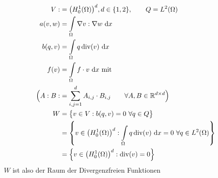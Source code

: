 \begin{beispiel}\label{beispiel8.1} %
	\begin{align*}
		V:&=\big(H_0^1(\Omega)\big)^d,d\in\lbrace1,2\rbrace,\qquad Q=L^2(\Omega)\\
		a(v,w)&=\int\limits_\Omega\nabla v:\nabla w\text{ d} x\\
		b(q,v)&=\int\limits_\Omega q\operatorname{div}(v)\text{ d} x\\
		f(v)&=\int\limits_\Omega f\cdot v\text{ d} x\text{ mit }\\
		\Big( A:B:&=\sum\limits_{i,j=1}^d A_{i,j}\cdot B_{i,j}\qquad\forall A,B\in\mathbb{R}^{d\times d} \Big)\\
		W&=\big\lbrace v\in V:b(q,v)=0~\forall q\in Q\big\rbrace\\
		&=\left\lbrace v\in\big(H_0^1(\Omega)\big)^d:\int\limits_\Omega q\operatorname{div}(v)\text{ d} x=0~\forall q\in L^2(\Omega)\right\rbrace\\
		&=\left\lbrace v\in\big(H_0^1(\Omega)\big)^d:\operatorname{div}(v)=0\right\rbrace
	\end{align*}
	$W$ ist also der Raum der Divergenzfreien Funktionen
\end{beispiel}

